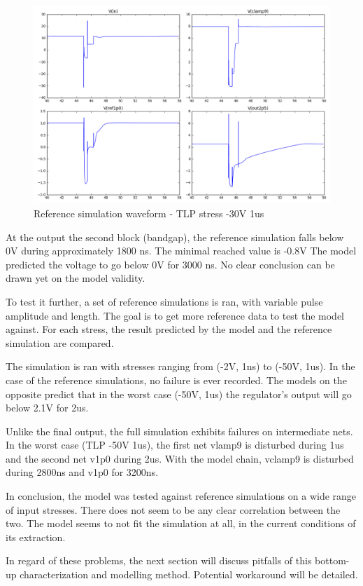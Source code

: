 \begin{figure}[]
  \centering
  \includegraphics[width=\textwidth]{src/4/figures/total_simulation.png}
  \caption{Reference simulation waveform - TLP stress -30V 1us }
  \label{fig:reference_simu}
\end{figure}

At the output the second block (bandgap), the reference simulation falls below 0V during approximately 1800 ns.
The minimal reached value is -0.8V
The model predicted the voltage to go below 0V for 3000 ns.
No clear conclusion can be drawn yet on the model validity.

To test it further, a set of reference simulations is ran, with variable pulse amplitude and length.
The goal is to get more reference data to test the model against.
For each stress, the result predicted by the model and the reference simulation are compared.

The simulation is ran with stresses ranging from (-2V, 1ns) to (-50V, 1us).
In the case of the reference simulations, no failure is ever recorded.
The models on the opposite predict that in the worst case (-50V, 1us) the regulator's output will go below 2.1V for 2us.

Unlike the final output, the full simulation exhibits failures on intermediate nets.
In the worst case (TLP -50V 1us), the first net vlamp9 is disturbed during 1us and the second net v1p0 during 2us.
With the model chain, vclamp9 is disturbed during 2800ns and v1p0 for 3200ns.

In conclusion, the model was tested against reference simulations on a wide range of input stresses.
There does not seem to be any clear correlation between the two.
The model seems to not fit the simulation at all, in the current conditions of its extraction.

In regard of these problems, the next section will discuss pitfalls of this bottom-up characterization and modelling method.
Potential workaround will be detailed.
